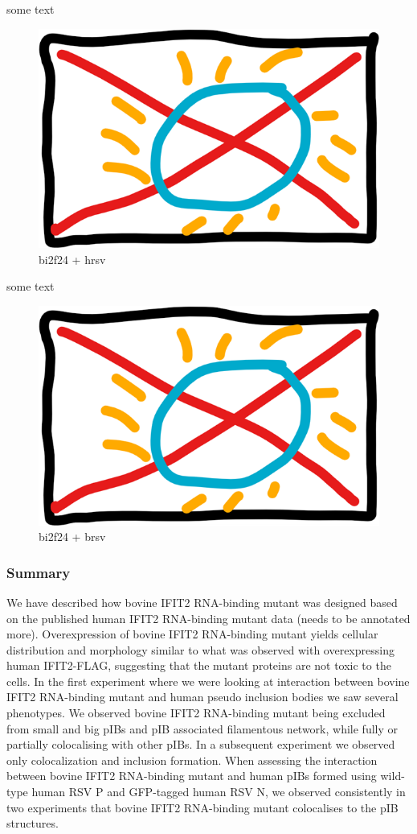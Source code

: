 some text

\begin{figure}
    \centering
    \includegraphics[width=0.5\linewidth]{10. Chapter 5//Figs//04. IFIT2-mutant confocal/00. placeholder.png}
    \caption[bi2f24 + hrsv]{bi2f24 + hrsv}
    \label{bi2f24 + hrsv}
\end{figure}

some text

\begin{figure}
    \centering
    \includegraphics[width=0.5\linewidth]{10. Chapter 5//Figs//04. IFIT2-mutant confocal/00. placeholder.png}
    \caption[bi2f24 + brsv]{bi2f24 + brsv}
    \label{bi2f24 + brsv}
\end{figure}

\subsubsection{Summary}
We have described how bovine IFIT2 RNA-binding mutant was designed based on the published human IFIT2 RNA-binding mutant data (needs to be annotated more). Overexpression of bovine IFIT2 RNA-binding mutant yields cellular distribution and morphology similar to what was observed with overexpressing human IFIT2-FLAG, suggesting that the mutant proteins are not toxic to the cells. In the first experiment where we were looking at interaction between bovine IFIT2 RNA-binding mutant and human pseudo inclusion bodies we saw several phenotypes. We observed bovine IFIT2 RNA-binding mutant being excluded from small and big pIBs and pIB associated filamentous network, while fully or partially colocalising with other pIBs. In a subsequent experiment we observed only colocalization and inclusion formation. When assessing the interaction between bovine IFIT2 RNA-binding mutant and human pIBs formed using wild-type human RSV P and GFP-tagged human RSV N, we observed consistently in two experiments that bovine IFIT2 RNA-binding mutant colocalises to the pIB structures.